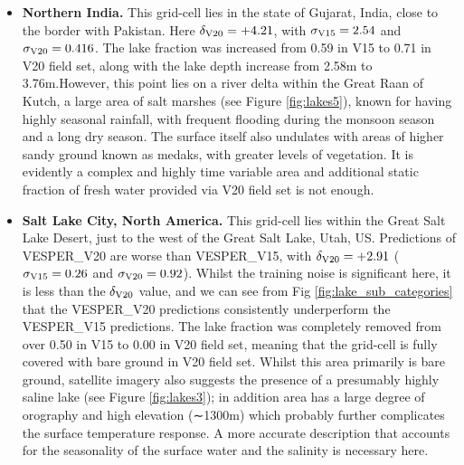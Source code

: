 \documentclass[hess, twostagejnl]{copernicus}
\begin{document}
\begin{itemize}
	
		\item \textbf{Northern India.} This grid-cell lies in the state of Gujarat, India, close to the border with Pakistan. Here $\delta_{\rm V20} = +4.21$, with $\sigma_{\rm V15} = 2.54$ and $\sigma_{\rm V20}=0.416$. The lake fraction was increased from 0.59 in V15 to 0.71 in V20 field set, along with the lake depth increase from 2.58m to 3.76m.However, this point lies on a river delta within the Great Raan of Kutch, a large area of salt marshes (see Figure \ref{fig:lakes5}), known for having highly seasonal rainfall, with frequent flooding during the monsoon season and a long dry season. The surface itself also undulates with areas of higher sandy ground known as medaks, with greater levels of vegetation. It is evidently a complex and highly time variable area and additional static fraction of fresh water provided via V20 field set is not enough.
	
	\item \textbf{Salt Lake City, North America.} This grid-cell lies within the Great Salt Lake Desert, just to the west of the Great Salt Lake, Utah, US. Predictions of VESPER\_V20 are worse than VESPER\_V15, with $\delta_{\rm V20} = +2.91$ ( $\sigma_{\rm V15} = 0.26$ and $\sigma_{\rm V20}=0.92$). Whilst the training noise is significant here, it is less than the $\delta_{\rm V20}$ value, and we can see from Fig \ref{fig:lake_sub_categories} that the VESPER\_V20 predictions consistently underperform the VESPER\_V15 predictions. The lake fraction was completely removed from over 0.50 in V15 to 0.00 in V20 field set, meaning that the grid-cell is fully covered with bare ground in V20 field set. Whilst this area primarily is bare ground, satellite imagery also suggests the presence of a presumably highly saline lake (see Figure \ref{fig:lakes3}); in addition area has a large degree of orography and high elevation (∼1300m) which probably further complicates the surface temperature response. A more accurate description that accounts for the seasonality of the surface water and the salinity is necessary here.
	

\end{itemize}
\end{document}

